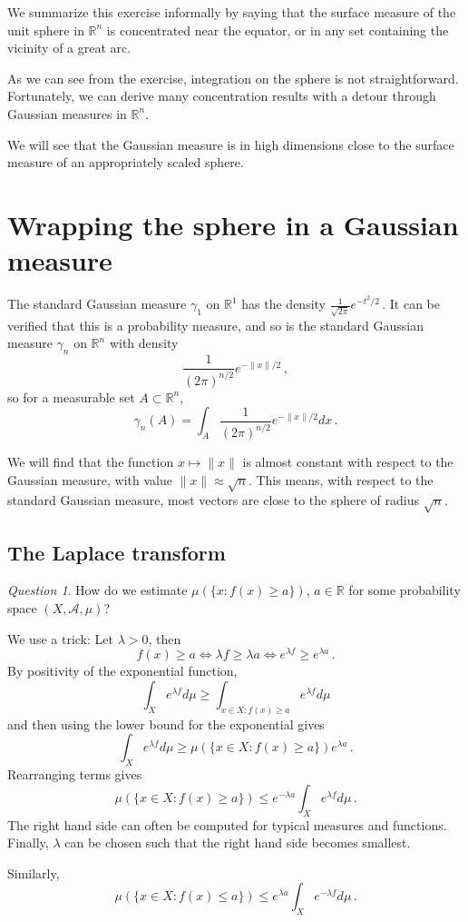 \documentclass[12pt]{article}
\theoremstyle{remark}
\newtheorem{question}[thm]{Question}
\def\Rn{\mathbb R^n}
\begin{document}
We summarize this  exercise informally by saying that the surface measure of the unit sphere in $\Rn$ is
concentrated near the equator, or in any set containing the vicinity of a great arc.

As we can see from the exercise, integration on the sphere is not straightforward. Fortunately, 
we can derive many concentration results with a detour through Gaussian measures in $\Rn$.

We will see that the Gaussian measure is in high dimensions close to the surface measure of an appropriately scaled sphere.

\section{Wrapping the sphere in a Gaussian measure}

The standard Gaussian measure $\gamma_1$ on $\mathbb R^1$ has the density
$
   \frac{1}{\sqrt{2\pi}} e^{-t^2/2} \, .
$
It can be verified that this is a probability measure, and so is the standard Gaussian measure $\gamma_n$ on $\Rn$
with density 
$$
  \frac{1}{(2\pi)^{n/2}} e^{-\|x\|/2} \, ,
$$
so for a measurable set $A \subset \Rn$,
$$
  \gamma_n(A) = \int_A  \frac{1}{(2\pi)^{n/2}} e^{-\|x\|/2} dx \, .
$$

We will find that the function $x \mapsto \|x\|$ is almost constant with respect to the Gaussian measure,
with value $\|x\|\approx \sqrt n$.
This means, with respect to the standard Gaussian measure, most vectors are close to the sphere of radius $\sqrt n$. 

\subsection{The Laplace transform}

\begin{question} How do we estimate $\mu(\{x: f(x) \ge a\})$, $a \in \mathbb R$
for some probability space $(X,\mathcal A, \mu)$?
\end{question}

We use a trick: Let $\lambda>0$, then 
$$
   f(x) \ge a \Leftrightarrow \lambda f \ge \lambda a \Leftrightarrow e^{\lambda f} \ge e^{\lambda a}\, .
$$
By positivity of the exponential function,
$$
   \int_X e^{\lambda f} d\mu \ge \int_{x\in X: f(x)\ge a} e^{\lambda f} d\mu
$$
and then using the lower bound for the exponential gives
$$
   \int_X e^{\lambda f} d\mu \ge \mu(\{x \in X: f(x) \ge a\}) e^{\lambda a} \, .
$$
Rearranging terms gives
$$
    \mu(\{x \in X: f(x) \ge a\}) \le e^{-\lambda a} \int_X e^{\lambda f} d\mu \, .
$$
The right hand side can often be computed for typical measures and functions. Finally,
$\lambda$ can be chosen such that the right hand side becomes smallest. 

Similarly,
$$
    \mu(\{x \in X: f(x) \le a\}) \le e^{\lambda a} \int_X e^{-\lambda f} d\mu \, .
$$
\end{document}
